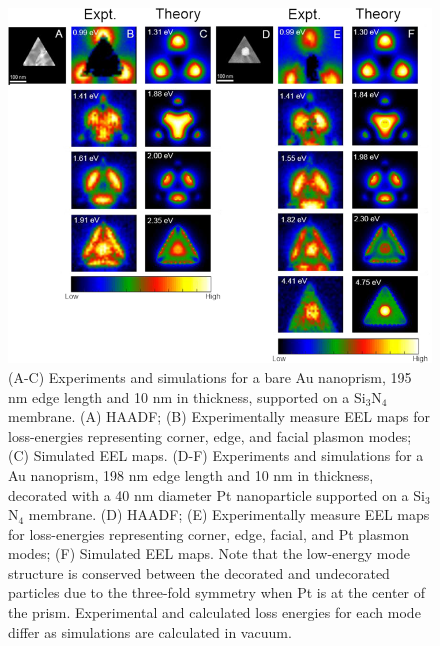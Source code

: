 \documentclass [11pt, proquest] {uwthesis}[2016/11/22]
\begin{document}
\begin{figure}
\begin{centering}
\includegraphics{prisms_mode_maps_center.png}
\caption{(A-C) Experiments and simulations for a bare Au nanoprism, 195 nm edge length and 10 nm in thickness, supported on a Si$_3$N$_4$ membrane. (A) HAADF; (B) Experimentally measure EEL maps for loss-energies representing corner, edge, and facial plasmon modes; (C) Simulated EEL maps. (D-F) Experiments and simulations for a Au nanoprism, 198 nm edge length and 10 nm in thickness, decorated with a 40 nm diameter Pt nanoparticle supported on a Si$_3$N$_4$ membrane. (D) HAADF; (E) Experimentally measure EEL maps for loss-energies representing corner, edge, facial, and Pt plasmon modes; (F) Simulated EEL maps. Note that the low-energy mode structure is conserved between the decorated and undecorated particles due to the three-fold symmetry when Pt is at the center of the prism. Experimental and calculated loss energies for each mode differ as simulations are calculated in vacuum.}
\label{modes_center}
\end{centering}
\end{figure}
\end{document}
